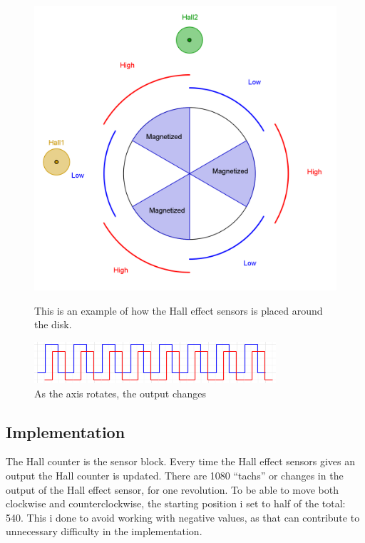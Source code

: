 \begin{figure}[h!]
  \centering
  \begin{minipage}[b]{0.6\textwidth}
    \includegraphics[width=\textwidth]{Billeder/FPGA/Motor_Magnets.png}
    \caption{This is an example of how the Hall effect sensors is placed around the disk.}
    \label{Motor_magnet}
  \end{minipage}
  \hfill
  \begin{minipage}[b]{0.3\textwidth}
    \includegraphics[width=\textwidth]{Billeder/FPGA/Hallcounteksemple.PNG}
    \caption{As the axis rotates, the output changes}
    \label{Hallcounteksemple}
  \end{minipage}
\end{figure}

\subsection{Implementation}

The Hall counter is the sensor block.
Every time the Hall effect sensors gives an output the Hall counter is updated. There are 1080 “tachs” or changes in the output of the Hall effect sensor, for one revolution. To be able to move both clockwise and counterclockwise, the starting position i set to half of the total: 540.
This i done to avoid working with negative values, as that can contribute to unnecessary difficulty in the implementation.

